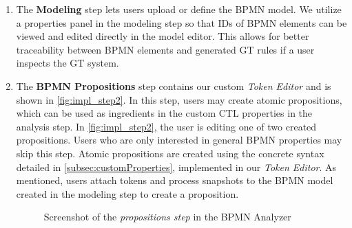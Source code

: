 \documentclass{lmcs} %
\begin{document}
\begin{enumerate}
  \item The \textbf{Modeling} step lets users upload or define the BPMN model.
  We utilize a properties panel in the modeling step so that IDs of BPMN elements can be viewed and edited directly in the model editor.
  This allows for better traceability between BPMN elements and generated GT rules if a user inspects the GT system.
  
  \item The \textbf{BPMN Propositions} step contains our custom \textit{Token Editor} and is shown in \autoref{fig:impl_step2}.
  In this step, users may create atomic propositions, which can be used as ingredients in the custom CTL properties in the analysis step.
  In \autoref{fig:impl_step2}, the user is editing one of two created propositions.
  Users who are only interested in general BPMN properties may skip this step.
  Atomic propositions are created using the concrete syntax detailed in \autoref{subsec:customProperties}, implemented in our \textit{Token Editor}.
  As mentioned, users attach tokens and process snapshots to the BPMN model created in the modeling step to create a proposition.

\begin{figure}[ht]
    \centering
    \caption{Screenshot of the \textit{propositions step} in the BPMN Analyzer}
    \label{fig:impl_step2}
\end{figure}
  

\end{enumerate}
\end{document}
